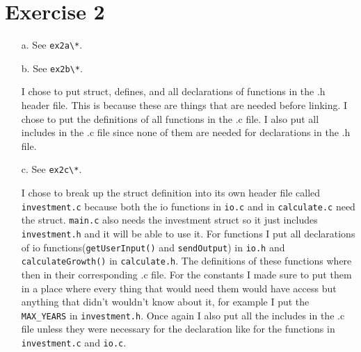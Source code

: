 \documentclass[12pt]{article}
\begin{document}
\section*{Exercise 2}
\begin{enumerate}
    \item[a.]
    See \verb|ex2a\*|.

    \item[b.]
    See \verb|ex2b\*|.
    
    I chose to put struct, defines, and all declarations of functions in the .h header file.
    This is because these are things that are needed before linking.
    I chose to put the definitions of all functions in the .c file.
    I also put all includes in the .c file since none of them are needed for declarations in the .h file.

    \item[c.]
    See \verb|ex2c\*|.

    I chose to break up the struct definition into its own header file called \verb|investment.c| because both the io functions in \verb|io.c| and in \verb|calculate.c| need the struct.
    \verb|main.c| also needs the investment struct so it just includes \verb|investment.h| and it will be able to use it.
    For functions I put all declarations of io functions(\verb|getUserInput()| and \verb|sendOutput|) in \verb|io.h| and \verb|calculateGrowth()| in \verb|calculate.h|.
    The definitions of these functions where then in their corresponding .c file.
    For the constants I made sure to put them in a place where every thing that would need them would have access but anything that didn't wouldn't know about it, for example I put the \verb|MAX_YEARS| in \verb|investment.h|.
    Once again I also put all the includes in the .c file unless they were necessary for the declaration like for the functions in \verb|investment.c| and \verb|io.c|.

\end{enumerate}
\end{document}

